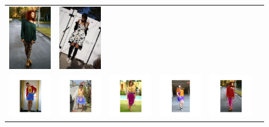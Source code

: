 \begin{figure}[H]
\begin{tabular}{cccccc}
		\includegraphics[width=.15\textwidth]{figures/processedimages/original/0289352.jpg} &
		\includegraphics[width=.15\textwidth]{figures/processedimages/original/0339823.jpg}\\
		\includegraphics[width=.15\textwidth ,trim=13cm 5cm 13cm 5cm,clip]{figures/processedimages/28fixedindices/0153056} & 
		\includegraphics[width=.15\textwidth ,trim=13cm 5cm 13cm 5cm,clip]{figures/processedimages/28fixedindices/0169465} &
		\includegraphics[width=.15\textwidth ,trim=13cm 5cm 13cm 5cm,clip]{figures/processedimages/28fixedindices/0196875} &
		\includegraphics[width=.15\textwidth ,trim=13cm 5cm 13cm 5cm,clip]{figures/processedimages/28fixedindices/0201966} &
		\includegraphics[width=.15\textwidth ,trim=13cm 5cm 13cm 5cm,clip]{figures/processedimages/28fixedindices/0289352} & 

\end{tabular}
\end{figure}
